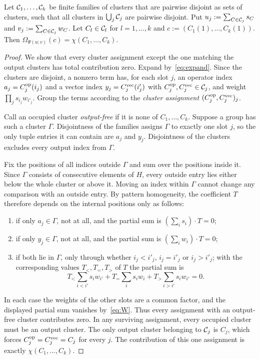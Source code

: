 \begin{lemma}\label{lem:C}
Let $\mathcal{C}_1,\dots,\mathcal{C}_k$ be finite families of clusters that are pairwise disjoint as sets of clusters, such that all
clusters in $\bigcup_j\mathcal{C}_j$ are pairwise disjoint. Put $u_j:=\sum_{C\in\mathcal{C}_j}s_C$ and $v_j:=\sum_{C\in\mathcal{C}_j}w_C$. Let
$C_l\in\mathcal{C}_l$ for $l=1,\dots,k$ and $c:=(C_1(1),\dots,C_k(1))$. Then $\Omega_{\Psi(u;v)}(c)=\chi(C_1,\dots,C_k)$.
\end{lemma}

\begin{proof}
We show that every cluster assignment except the one matching the output clusters has total contribution zero.
Expand by~\eqref{eq:expand}. Since the clusters are disjoint, a nonzero term has, for each slot $j$, an operator index
$a_j=C^{\mathrm{op}}_j(i_j)$ and a vector index $y_j=C^{\mathrm{vec}}_j(i'_j)$ with $C^{\mathrm{op}}_j,C^{\mathrm{vec}}_j\in\mathcal{C}_j$, and weight
$\prod_js_{i_j}w_{i'_j}$. Group the terms according to the \emph{cluster assignment} $(C^{\mathrm{op}}_j,C^{\mathrm{vec}}_j)_{j}$.

Call an occupied cluster \emph{output-free} if it is none of $C_1,\dots,C_k$. Suppose a group has such a cluster
$\Gamma$. Disjointness of the families assigns $\Gamma$ to exactly one slot $j$, so the only tuple entries it can
contain are $a_j$ and $y_j$. Disjointness of the clusters excludes every output index from $\Gamma$.

Fix the positions of all indices outside $\Gamma$ and sum over the positions inside it. Since $\Gamma$ consists of
consecutive elements of $H$, every outside entry lies either below the whole cluster or above it. Moving an index
within $\Gamma$ cannot change any comparison with an outside entry. By pattern homogeneity, the coefficient $T$
therefore depends on the internal positions only as follows:
\begin{enumerate}
\item[(i)] if only $a_j\in\Gamma$, not at all, and the partial sum is $(\sum_is_i)\cdot T=0$;
\item[(ii)] if only $y_j\in\Gamma$, not at all, and the partial sum is $(\sum_iw_i)\cdot T=0$;
\item[(iii)] if both lie in $\Gamma$, only through whether $i_j<i'_j$, $i_j=i'_j$ or $i_j>i'_j$; with the corresponding
values $T_<,T_=,T_>$ of $T$ the partial sum is
\[
T_<\sum_{i<i'}s_iw_{i'}+T_=\sum_is_iw_i+T_>\sum_{i>i'}s_iw_{i'}=0 .
\]
\end{enumerate}
In each case the weights of the other slots are a common factor, and the displayed partial sum vanishes
by~\eqref{eq:W}. Thus every assignment with an output-free cluster contributes zero. In any surviving assignment,
every occupied cluster must be an output cluster. The only output cluster belonging to $\mathcal{C}_j$ is $C_j$, which forces
$C^{\mathrm{op}}_j=C^{\mathrm{vec}}_j=C_j$ for every $j$. The contribution of this one assignment is exactly
$\chi(C_1,\dots,C_k)$.
\end{proof}

